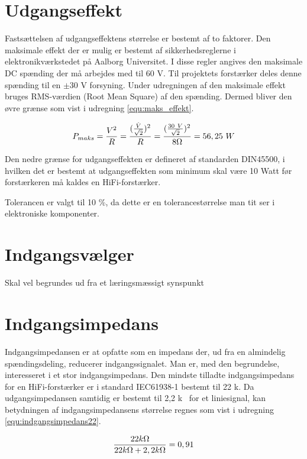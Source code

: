 \section{Udgangseffekt}
\label{krav_udgangseffekt}
Fastsættelsen af udgangseffektens størrelse er bestemt af to faktorer. Den maksimale effekt der er mulig er bestemt af sikkerhedsreglerne i elektronikværkstedet på Aalborg Universitet. I disse regler angives den maksimale DC spænding der må arbejdes med til 60 V. Til projektets forstærker deles denne spænding til en $\pm$30 V forsyning. Under udregningen af den maksimale effekt bruges RMS-værdien (Root Mean Square) af den spænding. Dermed bliver den øvre grænse som vist i udregning \ref{equ:maks_effekt}.

\begin{equation}
\label{equ:maks_effekt}
P_{maks} = \frac{V^2}{R}= \frac{(\frac{\hat{V}}{\sqrt{2}})^2}{R} = \frac{(\frac{30~V}{\sqrt{2}})^2}{8\ohm} = 56,25~W
\end{equation}

Den nedre grænse for udgangseffekten er defineret af standarden DIN45500, i hvilken det er bestemt at udgangseffekten som minimum skal være 10 Watt før forstærkeren må kaldes en HiFi-forstærker.

Tolerancen er valgt til 10 \%, da dette er en tolerancestørrelse man tit ser i elektroniske komponenter.

\section{Indgangsvælger}
\label{krav_indgangsvaelger}
Skal vel begrundes ud fra et læringsmæssigt synspunkt

\section{Indgangsimpedans}
\label{krav_indgangsimpedans}
Indgangsimpedansen er at opfatte som en impedans der, ud fra en almindelig spændingsdeling, reducerer indgangssignalet. Man er, med den begrundelse, interesseret i et stor indgangsimpedans. Den mindste tilladte indgangsimpedans for en HiFi-forstærker er i standard IEC61938-1 bestemt til 22 k\ohm. Da udgangsimpedansen samtidig er bestemt til 2,2 k\ohm~ for et liniesignal, kan betydningen af indgangsimpedansens størrelse regnes som vist i udregning \ref{equ:indgangsimpedans22}. 

\begin{equation}
\label{equ:indgangsimpedans22}
\frac{22 k\ohm}{22 k\ohm + 2,2 k\ohm} = 0,91
\end{equation}


